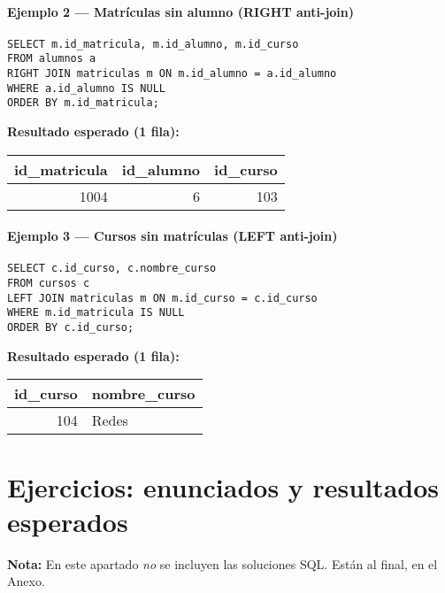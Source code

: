 \documentclass[11pt,a4paper]{article}
\begin{document}
\paragraph{Ejemplo 2 — Matrículas sin alumno (RIGHT anti-join)}
\begin{lstlisting}
SELECT m.id_matricula, m.id_alumno, m.id_curso
FROM alumnos a
RIGHT JOIN matriculas m ON m.id_alumno = a.id_alumno
WHERE a.id_alumno IS NULL
ORDER BY m.id_matricula;
\end{lstlisting}

\textbf{Resultado esperado (1 fila):}
\begin{center}
\begin{tabular}{r r r}
\toprule
id\_matricula & id\_alumno & id\_curso \\
\midrule
1004 & 6 & 103 \\
\bottomrule
\end{tabular}
\end{center}

\paragraph{Ejemplo 3 — Cursos sin matrículas (LEFT anti-join)}
\begin{lstlisting}
SELECT c.id_curso, c.nombre_curso
FROM cursos c
LEFT JOIN matriculas m ON m.id_curso = c.id_curso
WHERE m.id_matricula IS NULL
ORDER BY c.id_curso;
\end{lstlisting}

\textbf{Resultado esperado (1 fila):}
\begin{center}
\begin{tabular}{r l}
\toprule
id\_curso & nombre\_curso \\
\midrule
104 & Redes \\
\bottomrule
\end{tabular}
\end{center}


\section{Ejercicios: enunciados y resultados esperados}

\textbf{Nota:} En este apartado \emph{no} se incluyen las soluciones SQL. Están al final, en el Anexo.
\end{document}
